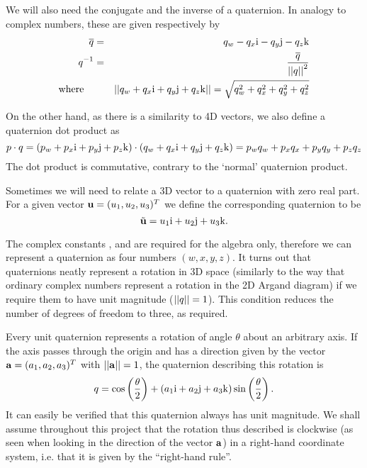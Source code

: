 We will also need the conjugate and the inverse of a quaternion. In analogy to
complex numbers, these are given respectively by
\begin{eqnarray}
\overline{\mbox{$q$}} & = & q_w - q_x\mbox{$\mathrm{i}$} - q_y\mbox{$\mathrm{j}$} - q_z\mbox{$\mathrm{k}$}\\
\mbox{$q$}^{-1} & = & \frac{\overline{\mbox{$q$}}}{\mbox{$||\mbox{$q$}||$}^2}\\
\mathrm{where}\quad&& \mbox{$||q_w + q_x\mbox{$\mathrm{i}$} + q_y\mbox{$\mathrm{j}$} + q_z\mbox{$\mathrm{k}$}||$} =
    \sqrt{q_w^2 + q_x^2 + q_y^2 + q_z^2}
\end{eqnarray}

On the other hand, as there is a similarity to 4D vectors, we also define a
quaternion dot product as
\begin{equation}
\mbox{$p$}\cdot\mbox{$q$} =
    (p_w + p_x\mbox{$\mathrm{i}$} + p_y\mbox{$\mathrm{j}$} + p_z\mbox{$\mathrm{k}$})\cdot (q_w + q_x\mbox{$\mathrm{i}$} + q_y\mbox{$\mathrm{j}$} + q_z\mbox{$\mathrm{k}$}) =
    p_w q_w + p_x q_x + p_y q_y + p_z q_z
\end{equation}
The dot product is commutative, contrary to the `normal' quaternion product.

Sometimes we will need to relate a 3D vector to a quaternion with zero real part.
For a given vector $\ve{u} = (u_1, u_2, u_3)^T$ we define the corresponding
quaternion to be
\begin{equation}
\label{vectorToQuat}
\tilde{\ve{u}} = u_1\qi + u_2\qj + u_3\qk.
\end{equation}

The complex constants \qi{}, \qj{} and \qk{} are required for the algebra
only, therefore we can represent a quaternion as four numbers $(w,x,y,z)$. It turns out that
quaternions neatly represent a rotation in 3D space (similarly to the way that ordinary complex
numbers represent a rotation in the 2D Argand diagram) if we require them to have unit
magnitude ($\mbox{$||\mbox{$q$}||$} = 1$).  This condition reduces the number of degrees of freedom to three,
as required.

Every unit quaternion represents a rotation of angle $\theta$ about an arbitrary axis.
If the axis passes through the origin and has a direction given by the vector
$\ve{a} = (a_1, a_2, a_3)^T$ with $\norm{\ve{a}} = 1$, the quaternion describing
this rotation is
\begin{equation}
\label{quatRotation}
\mbox{$q$} = \cos\left(\frac{\theta}{2}\right) + (a_1\mbox{$\mathrm{i}$} + a_2\mbox{$\mathrm{j}$} +
    a_3\mbox{$\mathrm{k}$}) \sin\left(\frac{\theta}{2}\right).
\end{equation}
It can easily be verified that this quaternion always has unit magnitude.
We shall assume throughout this project that the rotation thus described is clockwise (as seen
when looking in the direction of the vector $\ve{a}$) in a right-hand coordinate system,
i.e. that it is given by the ``right-hand rule''.

